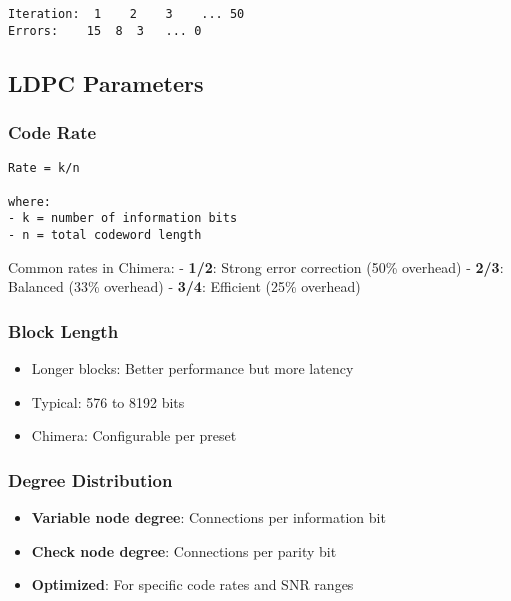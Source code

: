 \begin{verbatim}
Iteration:  1    2    3    ... 50
Errors:    15  8  3   ... 0  
\end{verbatim}

\subsection{LDPC Parameters}\label{ldpc-parameters}

\subsubsection{Code Rate}\label{code-rate}

\begin{verbatim}
Rate = k/n

where:
- k = number of information bits
- n = total codeword length
\end{verbatim}

Common rates in Chimera: - \textbf{1/2}: Strong error correction (50\%
overhead) - \textbf{2/3}: Balanced (33\% overhead) - \textbf{3/4}:
Efficient (25\% overhead)

\subsubsection{Block Length}\label{block-length}

\begin{itemize}
\tightlist
\item
  Longer blocks: Better performance but more latency
\item
  Typical: 576 to 8192 bits
\item
  Chimera: Configurable per preset
\end{itemize}

\subsubsection{Degree Distribution}\label{degree-distribution}

\begin{itemize}
\tightlist
\item
  \textbf{Variable node degree}: Connections per information bit
\item
  \textbf{Check node degree}: Connections per parity bit
\item
  \textbf{Optimized}: For specific code rates and SNR ranges
\end{itemize}

